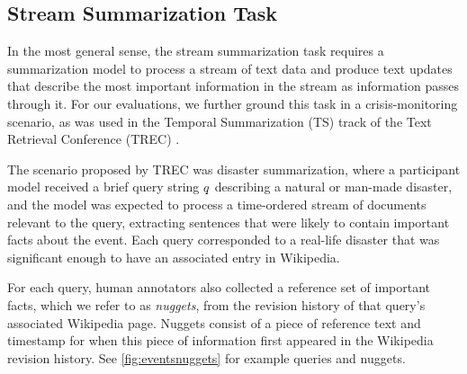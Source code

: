 \subsection{Stream Summarization Task}

In the most general sense, the stream summarization task requires a 
summarization model to process a stream of text data and produce text updates
that describe the most important information in the
stream as information passes through it. 
For our evaluations, we further ground this task in a crisis-monitoring
scenario, as was used in the Temporal Summarization (TS) track 
of the Text Retrieval Conference (TREC)
\citep{aslam2015trec,aslam2016trec}.

The scenario proposed by TREC was disaster
summarization, where a participant model received a brief query string 
$q{}$ describing a natural or man-made disaster, and the model was 
expected to process a time-ordered stream of documents relevant to the query, 
extracting sentences that were likely to contain important facts about the
event. Each query corresponded to a real-life disaster that was significant
enough to have an associated entry in Wikipedia. 








For each query, human annotators also collected a reference set of important 
facts, which we refer to as \textit{nuggets}, 
from the revision history of that query's associated Wikipedia page. 
Nuggets consist of a piece of reference text and timestamp for when this piece
of information first appeared in the Wikipedia revision history. 
See \autoref{fig:eventsnuggets} for example queries and nuggets.



